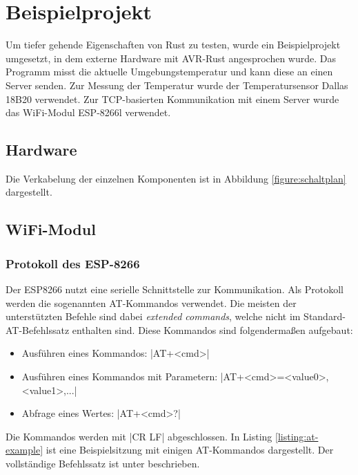 \documentclass
[ 12pt,
  parskip=half %
]{scrreprt}
\begin{document}
\chapter{Beispielprojekt}
\label{sec:Beispielprojekt}

Um tiefer gehende Eigenschaften von Rust zu testen, wurde ein Beispielprojekt umgesetzt, in dem externe Hardware mit AVR-Rust angesprochen wurde. Das Programm misst die aktuelle Umgebungstemperatur und kann diese an einen Server senden. Zur Messung der Temperatur wurde der Temperatursensor Dallas 18B20 verwendet. Zur TCP-basierten Kommunikation mit einem Server wurde das WiFi-Modul ESP-8266l verwendet.
		
\section{Hardware}

Die Verkabelung der einzelnen Komponenten ist in Abbildung \ref{figure:schaltplan} dargestellt.


\section{WiFi-Modul}

\subsection{Protokoll des ESP-8266}

Der ESP8266 nutzt eine serielle Schnittstelle zur Kommunikation. Als Protokoll werden die sogenannten AT-Kommandos verwendet. Die meisten der unterstützten Befehle sind dabei \textit{extended commands}, welche nicht im Standard-AT-Befehlssatz enthalten sind. Diese Kommandos sind folgendermaßen aufgebaut:
\begin{itemize}
	\item Ausführen eines Kommandos: \textinline|AT+<cmd>|
	\item Ausführen eines Kommandos mit Parametern: \textinline|AT+<cmd>=<value0>,<value1>,...|
	\item Abfrage eines Wertes: \textinline|AT+<cmd>?|
\end{itemize}

Die Kommandos werden mit \textinline|CR LF| abgeschlossen. In Listing \ref{listing:at-example} ist eine Beispielsitzung mit einigen AT-Kommandos dargestellt. Der vollständige Befehlssatz ist unter \cite{esp8266-cmds} beschrieben.
\end{document}
